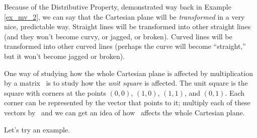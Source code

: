 %
%
%


Because of the Distributive Property, demonstrated way back in Example \ref{ex_mv_2}, we can say that the Cartesian plane will be \textit{transformed} in a very nice, predictable way. Straight lines will be transformed into other straight lines (and they won't become curvy, or jagged, or broken). Curved lines will be transformed into other curved lines (perhaps the curve will become ``straight,'' but it won't become jagged or broken).

One way of studying how the whole Cartesian plane is affected by multiplication by a matrix \tta\ is to study how the \textit{unit square} is affected. The unit square is the square with corners at the points $(0,0)$, $(1,0)$, $(1,1)$, and $(0,1)$. Each corner can be represented by the vector that points to it; multiply each of these vectors by \tta\ and we can get an idea of how \tta\ affects the whole Cartesian plane. 

Let's try an example.\\

